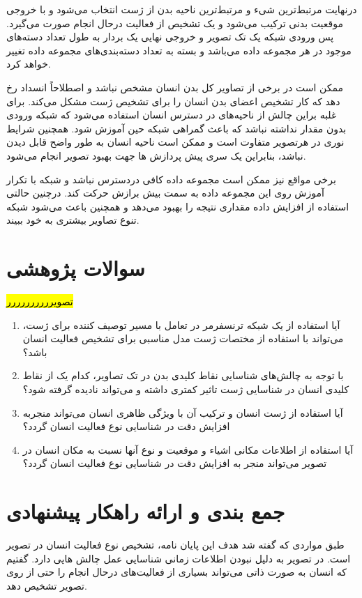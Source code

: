 درنهایت مرتبط‌ترین شیء و مرتبط‌ترین ناحیه بدن از ژست انتخاب می‌شود و با خروجی موقعیت بدنی ترکیب می‌شود و یک تشخیص از فعالیت درحال انجام صورت می‌گیرد. پس ورودی شبکه یک تک تصویر و خروجی نهایی یک بردار به طول تعداد دسته‌های موجود در هر مجموعه داده می‌باشد و بسته به تعداد دسته‌بندی‌های مجموعه داده تغییر خواهد کرد. 

ممکن است در برخی از تصاویر کل بدن انسان مشخص نباشد و اصطلاحاً انسداد رخ دهد که کار تشخیص اعضای بدن انسان را برای تشخیص ژست مشکل می‌کند. برای غلبه براین چالش از ناحیه‌های در دسترس انسان استفاده می‌شود که شبکه ورودی بدون مقدار نداشته نباشد که باعث گمراهی شبکه حین آموزش شود. همچنین شرایط نوری در هرتصویر متفاوت است و ممکن است ناحیه انسان به طور واضح قابل دیدن نباشد، بنابراین یک سری پیش پردازش ها جهت بهبود تصویر انجام می‌شود.

برخی مواقع نیز ممکن است مجموعه داده کافی دردسترس نباشد و شبکه با تکرار آموزش روی این مجموعه داده به سمت بیش برازش حرکت کند. درچنین حالتی استفاده از افزایش داده مقداری نتیجه را بهبود می‌دهد و همچنین باعث می‌شود شبکه تنوع تصاویر بیشتری به خود ببیند.
\section{سوالات پژوهشی} 
\hl{تصویرررررررررر}
\begin{enumerate}
	\item 
	آیا استفاده از یک شبکه ترنسفرمر در تعامل با مسیر توصیف کننده برای ژست، می‌تواند با استفاده از مختصات ژست مدل مناسبی برای تشخیص فعالیت انسان باشد؟
	\item
	با توجه به چالش‌های شناسایی نقاط کلیدی بدن در تک تصاویر، کدام یک از نقاط کلیدی انسان در شناسایی ژست تاثیر کمتری داشته و می‌‌تواند نادیده گرفته شود؟
	\item
	آیا استفاده از ژست انسان و ترکیب آن با ویژگی ظاهری انسان می‌تواند منجربه افزایش دقت در شناسایی نوع فعالیت انسان گردد؟
	\item
	آیا استفاده از اطلاعات مکانی اشیاء و موقعیت و نوع آنها نسبت به مکان انسان در تصویر می‌تواند منجر به افزایش دقت در شناسایی نوع فعالیت انسان گردد؟
\end{enumerate}
\section{جمع بندی و ارائه راهکار پیشنهادی} 

طبق مواردی که گفته شد هدف این پایان نامه، تشخیص نوع فعالیت انسان در تصویر است. در تصویر به دلیل نبودن اطلاعات زمانی شناسایی عمل چالش هایی دارد. گفتیم که انسان به صورت ذاتی می‌تواند بسیاری از فعالیت‌های درحال انجام را حتی از روی تصویر تشخیص دهد.


